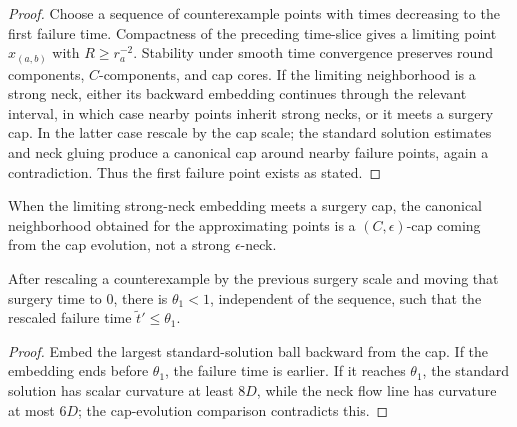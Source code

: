 \begin{proof}
\sketch
{}
Choose a sequence of counterexample points with times decreasing to the first
failure time. Compactness of the preceding time-slice gives a limiting point
$x_{(a,b)}$ with $R\geq r_a^{-2}$. Stability under smooth time convergence
preserves round components, $C$-components, and cap cores. If the limiting
neighborhood is a strong neck, either its backward embedding continues through
the relevant interval, in which case nearby points inherit strong necks, or it
meets a surgery cap. In the latter case rescale by the cap scale; the standard
solution estimates and neck gluing produce a canonical cap around nearby failure
points, again a contradiction. Thus the first failure point exists as stated.
\end{proof}

\begin{remark}
\label{rem:limit-canonical-neighborhood-is-cap}
When the limiting strong-neck embedding meets a surgery cap, the canonical
neighborhood obtained for the approximating points is a $(C,\epsilon)$-cap
coming from the cap evolution, not a strong $\epsilon$-neck.
\end{remark}

\begin{claim}
\label{claim:tilde-t-prime-bounded-by-theta1}
After rescaling a counterexample by the previous surgery scale and moving that
surgery time to $0$, there is $\theta_1<1$, independent of the sequence, such
that the rescaled failure time $\widetilde t'\leq\theta_1$.
\end{claim}

\begin{proof}
\sketch
{}
Embed the largest standard-solution ball backward from the cap. If the embedding
ends before $\theta_1$, the failure time is earlier. If it reaches $\theta_1$,
the standard solution has scalar curvature at least $8D$, while the neck flow
line has curvature at most $6D$; the cap-evolution comparison contradicts this.
\end{proof}

